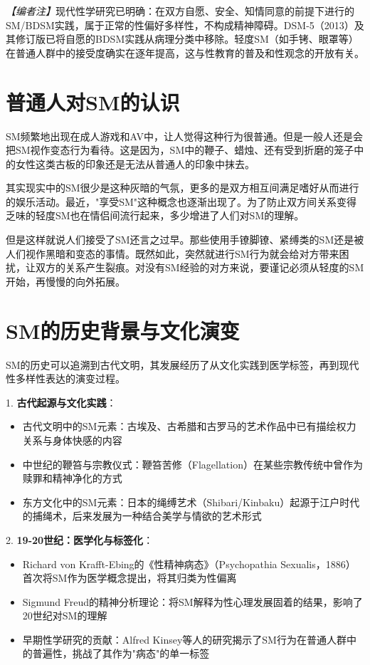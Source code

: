\documentclass[12pt,UTF8]{ctexbook}
\begin{document}
\textit{【编者注】}现代性学研究已明确：在双方自愿、安全、知情同意的前提下进行的SM/BDSM实践，属于正常的性偏好多样性，不构成精神障碍。DSM-5（2013）及其修订版已将自愿的BDSM实践从病理分类中移除\citep{apa2022dsm5tr}。轻度SM（如手铐、眼罩等）在普通人群中的接受度确实在逐年提高，这与性教育的普及和性观念的开放有关。

\section{普通人对SM的认识}

SM频繁地出现在成人游戏和AV中，让人觉得这种行为很普通。但是一般人还是会把SM视作变态行为看待。这是因为，SM中的鞭子、蜡烛、还有受到折磨的笼子中的女性这类古板的印象还是无法从普通人的印象中抹去。

其实现实中的SM很少是这种灰暗的气氛，更多的是双方相互间满足嗜好从而进行的娱乐活动。最近，"享受SM"这种概念也逐渐出现了。为了防止双方间关系变得乏味的轻度SM也在情侣间流行起来，多少增进了人们对SM的理解。

但是这样就说人们接受了SM还言之过早。那些使用手镣脚镣、紧缚类的SM还是被人们视作黑暗和变态的事情。既然如此，突然就进行SM行为就会给对方带来困扰，让双方的关系产生裂痕。对没有SM经验的对方来说，要谨记必须从轻度的SM开始，再慢慢的向外拓展。

\section{SM的历史背景与文化演变}

SM的历史可以追溯到古代文明，其发展经历了从文化实践到医学标签，再到现代性多样性表达的演变过程。

1. \textbf{古代起源与文化实践}：
  \begin{itemize}
  \item 古代文明中的SM元素：古埃及、古希腊和古罗马的艺术作品中已有描绘权力关系与身体快感的内容
  \item 中世纪的鞭笞与宗教仪式：鞭笞苦修（Flagellation）在某些宗教传统中曾作为赎罪和精神净化的方式
  \item 东方文化中的SM元素：日本的绳缚艺术（Shibari/Kinbaku）起源于江户时代的捕绳术，后来发展为一种结合美学与情欲的艺术形式
  \end{itemize}

2. \textbf{19-20世纪：医学化与标签化}：
  \begin{itemize}
  \item Richard von Krafft-Ebing的《性精神病态》（Psychopathia Sexualis，1886）首次将SM作为医学概念提出，将其归类为性偏离
  \item Sigmund Freud的精神分析理论：将SM解释为性心理发展固着的结果，影响了20世纪对SM的理解
  \item 早期性学研究的贡献：Alfred Kinsey等人的研究揭示了SM行为在普通人群中的普遍性，挑战了其作为"病态"的单一标签
  \end{itemize}
\end{document}
